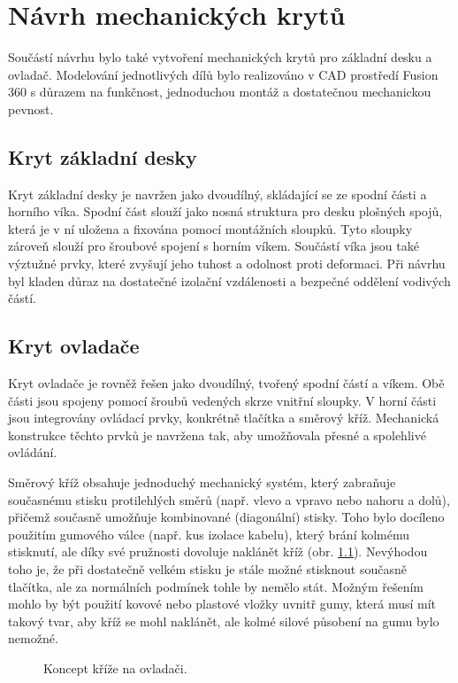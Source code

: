 \chapter{Návrh mechanických krytů}

Součástí návrhu bylo také vytvoření mechanických krytů pro základní desku a ovladač. Modelování
jednotlivých dílů bylo realizováno v CAD prostředí Fusion 360 s důrazem na funkčnost, jednoduchou
montáž a dostatečnou mechanickou pevnost.

\section{Kryt základní desky}

Kryt základní desky je navržen jako dvoudílný, skládající se ze spodní části a horního víka. Spodní
část slouží jako nosná struktura pro desku plošných spojů, která je v ní uložena a fixována pomocí
montážních sloupků. Tyto sloupky zároveň slouží pro šroubové spojení s horním víkem. Součástí víka
jsou také výztužné prvky, které zvyšují jeho tuhost a odolnost proti deformaci. Při návrhu byl
kladen důraz na dostatečné izolační vzdálenosti a bezpečné oddělení vodivých částí.

\section{Kryt ovladače}

Kryt ovladače je rovněž řešen jako dvoudílný, tvořený spodní částí a víkem. Obě části jsou spojeny
pomocí šroubů vedených skrze vnitřní sloupky. V horní části jsou integrovány ovládací prvky,
konkrétně tlačítka a směrový kříž. Mechanická konstrukce těchto prvků je navržena tak, aby
umožňovala přesné a spolehlivé ovládání.

Směrový kříž obsahuje jednoduchý mechanický systém, který zabraňuje současnému stisku protilehlých
směrů (např. vlevo a vpravo nebo nahoru a dolů), přičemž současně umožňuje kombinované (diagonální)
stisky. Toho bylo docíleno použitím gumového válce (např. kus izolace kabelu), který brání kolmému
stisknutí, ale díky své pružnosti dovoluje naklánět kříž (obr. \ref{fig:dpad}). Nevýhodou toho je,
že při dostatečně velkém stisku je stále možné stisknout současně tlačítka, ale za normálních
podmínek tohle by nemělo stát. Možným řešením mohlo by být použití kovové nebo plastové vložky
uvnitř gumy, která musí mít takový tvar, aby kříž se mohl naklánět, ale kolmé silové působení na
gumu bylo nemožné.

\begin{figure}[H]
    \centering
    
    \caption{Koncept kříže na ovladači.}
    \label{fig:dpad}
\end{figure}

